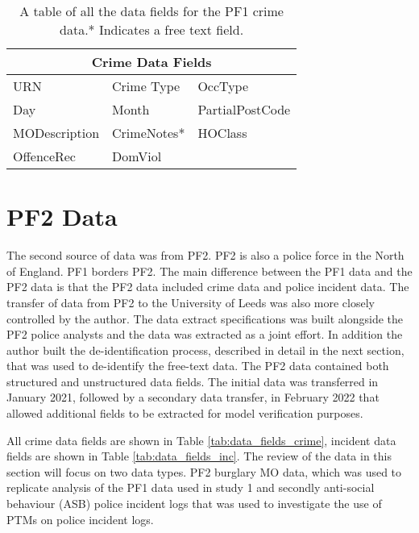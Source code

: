 \begin{table}[]
\centering
\begin{tabular}{@{}lll@{}}
\toprule
\multicolumn{3}{c}{Crime Data Fields}                          \\ \midrule
URN & Crime Type       & OccType      \\
Day           & Month          & PartialPostCode                \\
MODescription & CrimeNotes*             & HOClass            \\
OffenceRec  &  DomViol          &           \\ \bottomrule
\end{tabular}
\caption[Table of data fields for the PF1 data]{\label{tab:data_fields_PF1} A table of all the data fields for the PF1 crime data.* Indicates a free text field.}
\end{table}


\section{PF2 Data} The second source of data was from PF2. PF2 is also a police force in the North of England. PF1 borders PF2. The main difference between the PF1 data and the PF2 data is that the PF2 data included crime data and police incident data. The transfer of data from PF2 to the University of Leeds was also more closely controlled by the author. The data extract specifications was built alongside the PF2 police analysts and the data was extracted as a joint effort. In addition the author built the de-identification process, described in detail in the next section, that was used to de-identify the free-text data. The PF2 data contained both structured and unstructured data fields. The initial data was transferred in January 2021, followed by a secondary data transfer, in February 2022 that allowed additional fields to be extracted for model verification purposes. 

All crime data fields are shown in Table \ref{tab:data_fields_crime}, incident data fields are shown in Table \ref{tab:data_fields_inc}. The review of the data in this section will focus on two data types. PF2 burglary MO data, which was used to replicate analysis of the PF1 data used in study 1 and secondly anti-social behaviour (ASB) police incident logs that was used to investigate the use of PTMs on police incident logs.




